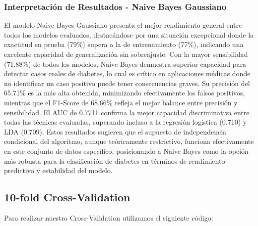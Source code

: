 \documentclass[12pt,a4paper]{article}
\begin{document}
\subsubsection{Interpretación de Resultados - Naive Bayes Gaussiano}

El modelo Naive Bayes Gaussiano presenta el mejor rendimiento general entre todos los modelos evaluados, destacándose por una situación excepcional donde la exactitud en prueba (79\%) supera a la de entrenamiento (77\%), indicando una excelente capacidad de generalización sin sobreajuste. Con la mayor sensibilidad (71.88\%) de todos los modelos, Naive Bayes demuestra superior capacidad para detectar casos reales de diabetes, lo cual es crítico en aplicaciones médicas donde no identificar un caso positivo puede tener consecuencias graves. Su precisión del 65.71\% es la más alta obtenida, minimizando efectivamente los falsos positivos, mientras que el F1-Score de 68.66\% refleja el mejor balance entre precisión y sensibilidad. El AUC de 0.7711 confirma la mejor capacidad discriminativa entre todas las técnicas evaluadas, superando incluso a la regresión logística (0.710) y LDA (0.709). Estos resultados sugieren que el supuesto de independencia condicional del algoritmo, aunque teóricamente restrictivo, funciona efectivamente en este conjunto de datos específico, posicionando a Naive Bayes como la opción más robusta para la clasificación de diabetes en términos de rendimiento predictivo y estabilidad del modelo.

\newpage

\subsection{10-fold Cross-Validation}

Para realizar nuestro Cross-Validation utilizamos el siguiente código:
\end{document}
